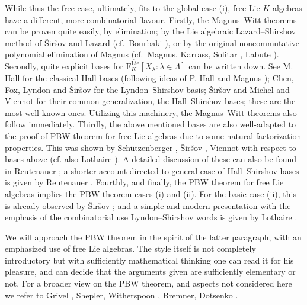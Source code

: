 \documentclass[11pt,a4paper]{amsart}
\DeclareMathOperator{\Lie}{Lie}
\theoremstyle{definition}
\theoremstyle{plain}
\begin{document}
While thus the free case, ultimately, fits to the global case (i), free Lie $K$-algebras have a different, more combinatorial flavour.
Firstly, the Magnus--Witt theorems can be proven quite easily, by
 elimination; by the Lie algebraic Lazard--Shirshov method of \v{S}ir\v{s}ov \cite{S0} and Lazard \cite{L2}
 (cf.~Bourbaki \cite{BX}),
 or by the original noncommutative polynomial elimination of Magnus \cite{MM}
 (cf.~Magnus, Karrass, Solitar \cite{MKS}, Labute \cite{Lab}).
Secondly, quite explicit bases for $\mathrm F_K^{\Lie}[X_\lambda : \lambda\in\Lambda]$ can be written down.
See M. Hall \cite{Ha} for the classical Hall bases (following ideas of P. Hall \cite{Ha0}  and Magnus \cite{MM});
 Chen, Fox, Lyndon \cite{CFL} and \v{S}ir\v{s}ov \cite{S2} for the Lyndon--Shirshov basis;
 \v{S}ir\v{s}ov \cite{S3} and Michel \cite{Mch} and Viennot \cite{V} for their common generalization, the Hall--Shirshov bases;
 these are the most well-known ones.
Utilizing this machinery, the Magnus--Witt theorems also follow immediately.
Thirdly, the above mentioned bases are also well-adapted to the proof of PBW theorem for free Lie algebras due to
 some natural factorization properties.
This was shown by Sch\"utzenberger \cite{Sc}, \v{S}ir\v{s}ov \cite{S2}, Viennot \cite{V} with respect to bases above
(cf. also Lothaire \cite{Lot}).
A detailed discussion of these  can also be found in Reutenauer \cite{R};
 a shorter account directed to general case of Hall--Shirshov bases is given by Reutenauer \cite{RR}.
Fourthly, and finally, the PBW theorem  for free Lie algebras implies the  PBW theorem cases (i) and (ii).
For the basic case (ii), this is already observed by \v{S}ir\v{s}ov \cite{S2}; and a simple and modern
 presentation with the emphasis of the combinatorial use Lyndon--Shirshov words is given by Lothaire \cite{Lot}.

We will approach the PBW theorem in the spirit of the latter paragraph, with an emphasized use of free Lie algebras.
The style itself is not completely introductory but with sufficiently mathematical thinking
 one can read it for his pleasure, and can decide that the arguments given are sufficiently elementary or not.
For a broader view on the PBW theorem, and aspects not considered here we refer to
 Grivel \cite{G},  Shepler, Witherspoon \cite{SW}, Bremner, Dotsenko \cite{BD}.
\end{document}
